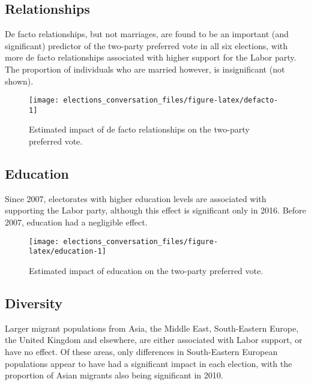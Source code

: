 \documentclass[11pt,a4paper,]{article}
\begin{document}
\hypertarget{relationships}{%
\subsection*{Relationships}\label{relationships}}

De facto relationships, but not marriages, are found to be an important (and significant) predictor of the two-party preferred vote in all six elections, with more de facto relationships associated with higher support for the Labor party. The proportion of individuals who are married however, is insignificant (not shown).

\begin{figure}[H]

{\centering \texttt{[image: elections\_conversation\_files/figure-latex/defacto-1]} 

}

\caption{Estimated impact of de facto relationships on the two-party preferred vote.}\label{fig:defacto}
\end{figure}

\hypertarget{education}{%
\subsection*{Education}\label{education}}

Since 2007, electorates with higher education levels are associated with supporting the Labor party, although this effect is significant only in 2016. Before 2007, education had a negligible effect.

\begin{figure}[H]

{\centering \texttt{[image: elections\_conversation\_files/figure-latex/education-1]} 

}

\caption{Estimated impact of education on the two-party preferred vote.}\label{fig:education}
\end{figure}

\hypertarget{diversity}{%
\subsection*{Diversity}\label{diversity}}

Larger migrant populations from Asia, the Middle East, South-Eastern Europe, the United Kingdom and elsewhere, are either associated with Labor support, or have no effect. Of these areas, only differences in South-Eastern European populations appear to have had a significant impact in each election, with the proportion of Asian migrants also being significant in 2010.
\end{document}
